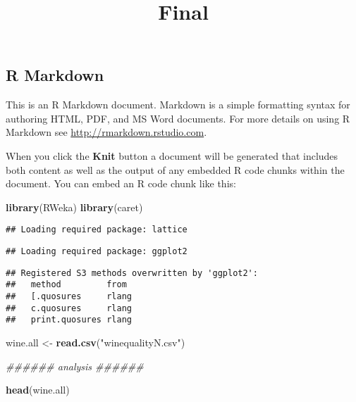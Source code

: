 \documentclass[]{article}
\title{Final}
\author{}
\date{}
\newenvironment{Shaded}{\begin{snugshade}}{\end{snugshade}}
\newcommand{\CommentTok}[1]{\textcolor[rgb]{0.56,0.35,0.01}{\textit{#1}}}
\newcommand{\KeywordTok}[1]{\textcolor[rgb]{0.13,0.29,0.53}{\textbf{#1}}}
\newcommand{\NormalTok}[1]{#1}
\newcommand{\StringTok}[1]{\textcolor[rgb]{0.31,0.60,0.02}{#1}}
\begin{document}
\maketitle

\hypertarget{r-markdown}{%
\subsection{R Markdown}\label{r-markdown}}

This is an R Markdown document. Markdown is a simple formatting syntax
for authoring HTML, PDF, and MS Word documents. For more details on
using R Markdown see \url{http://rmarkdown.rstudio.com}.

When you click the \textbf{Knit} button a document will be generated
that includes both content as well as the output of any embedded R code
chunks within the document. You can embed an R code chunk like this:

\begin{Shaded}
\begin{Highlighting}[]
\KeywordTok{library}\NormalTok{(RWeka)}
\KeywordTok{library}\NormalTok{(caret)}
\end{Highlighting}
\end{Shaded}

\begin{verbatim}
## Loading required package: lattice
\end{verbatim}

\begin{verbatim}
## Loading required package: ggplot2
\end{verbatim}

\begin{verbatim}
## Registered S3 methods overwritten by 'ggplot2':
##   method         from 
##   [.quosures     rlang
##   c.quosures     rlang
##   print.quosures rlang
\end{verbatim}

\begin{Shaded}
\begin{Highlighting}[]
\NormalTok{wine.all <-}\StringTok{ }\KeywordTok{read.csv}\NormalTok{(}\StringTok{"winequalityN.csv"}\NormalTok{)}

\CommentTok{###### analysis ######}

\KeywordTok{head}\NormalTok{(wine.all)}
\end{Highlighting}
\end{Shaded}
\end{document}
